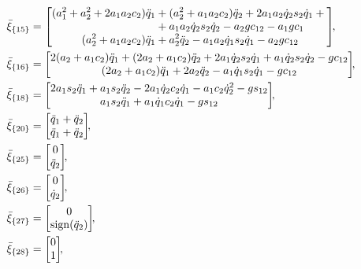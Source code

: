 \begin{align}
    &\bar{\xi}_{\{15\}} =
    \begin{bmatrix}
        \begin{split}
            (a_1^2 + a_2^2 + 2 a_1 a_2 c_2) \ddot{q}_1 &+ (a_2^2 + a_1 a_2 c_2 )\ddot{q}_2 + 2 a_1 a_2 \dot{q}_2 s_2 \dot{q}_1 + {} \\ {} &+ a_1 a_2 \dot{q}_2 s_2 \dot{q}_2 - a_2 g c_{12} - a_1 g c_1
            \\
            (a_2^2 + a_1 a_2 c_2) \ddot{q}_1 &+  a_2^2 \ddot{q}_2 - a_1 a_2 \dot{q}_1 s_2 \dot{q}_1 - a_2 g c_{12}
        \end{split}
    \end{bmatrix}\!\!,
    \\
    &\bar{\xi}_{\{16\}} =
    \begin{bmatrix}
        2 (a_2 + a_1 c_2) \ddot{q}_1 + (2 a_2 + a_1 c_2) \ddot{q}_2 + 2 a_1 \dot{q}_2 s_2 \dot{q}_1 + a_1 \dot{q}_2 s_2 \dot{q}_2 - g c_{12} \\
        (2 a_2 + a_1 c_2) \ddot{q}_1 + 2 a_2 \ddot{q}_2 - a_1 \dot{q}_1 s_2 \dot{q}_1 - g c_{12}
    \end{bmatrix}\!\!,
    \\
    &\bar{\xi}_{\{18\}} =
    \begin{bmatrix}
       2 a_1 s_2 \ddot{q}_1 + a_1 s_2 \ddot{q}_2 - 2 a_1 \dot{q}_2 c_2 \dot{q}_1 - a_1 c_2 \dot{q}_2^2 - g s_{12} \\
       a_1 s_2 \ddot{q}_1 + a_1 \dot{q}_1 c_2 \dot{q}_1 - g s_{12}
    \end{bmatrix}\!\!,
    \\
    &\bar{\xi}_{\{20\}} =
    \begin{bmatrix}
        \ddot{q}_1 + \ddot{q}_2 \\ \ddot{q}_1 + \ddot{q}_2
    \end{bmatrix}\!\!,
    \\
    &\bar{\xi}_{\{25\}} =
    \begin{bmatrix}
        0 \\ \ddot{q}_2
    \end{bmatrix}\!\!,
    \\
    &\bar{\xi}_{\{26\}} =
    \begin{bmatrix}
        0 \\ \dot{q}_2
    \end{bmatrix}\!\!,
    \\
    &\bar{\xi}_{\{27\}} =
    \begin{bmatrix}
        0 \\ \sign(\ddot{q}_2)
    \end{bmatrix}\!\!,
    \\
    &\bar{\xi}_{\{28\}} =
    \begin{bmatrix}
        0 \\ 1
    \end{bmatrix}\!\!,
\end{align}
